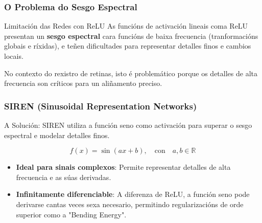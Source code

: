 \documentclass[xcolor=dvipsnames]{beamer}
\begin{document}
    \begin{frame}
        \frametitle{O Problema do Sesgo Espectral}

        \begin{block}{Limitación das Redes con ReLU}
            As funcións de activación lineais coma ReLU presentan un \textbf{sesgo espectral} cara funcións de baixa frecuencia (tranformacións globais e ríxidas), e teñen dificultades para representar detalles finos e cambios locais.
            
            \vspace{0.3cm}
            No contexto do rexistro de retinas, isto é problemático porque os detalles de alta frecuencia son críticos para un aliñamento preciso.
        \end{block}

    \end{frame}

    \begin{frame}
        \frametitle{SIREN (Sinusoidal Representation Networks)}

        \begin{alertblock}{A Solución: }
            SIREN utiliza a función seno como activación para superar o sesgo espectral e modelar detalles finos.
            
            \centering
            \[
            f(x) = \sin(ax + b), \quad \text{con} \quad a, b \in \mathbb{R}
            \]
            
            \begin{itemize}
                \item \textbf{Ideal para sinais complexos}: Permite representar detalles de alta frecuencia e as súas derivadas.
                \item \textbf{Infinitamente diferenciable}: A diferenza de ReLU, a función seno pode derivarse cantas veces sexa necesario, permitindo regularizacións de orde superior como a "Bending Energy".
            \end{itemize}
        \end{alertblock}

    \end{frame}
\end{document}
